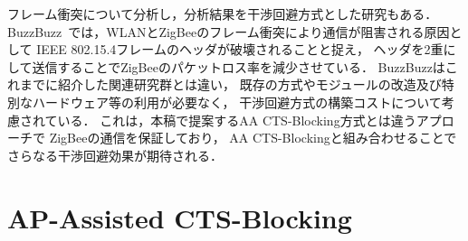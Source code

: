 \documentclass[technicalreport]{ieicej}
\begin{document}
フレーム衝突について分析し，分析結果を干渉回避方式とした研究もある．
BuzzBuzz~\cite{Chieh10:}では，WLANとZigBeeのフレーム衝突により通信が阻害される原因として
IEEE 802.15.4フレームのヘッダが破壊されることと捉え，
ヘッダを2重にして送信することでZigBeeのパケットロス率を減少させている．
BuzzBuzzはこれまでに紹介した関連研究群とは違い，
既存の方式やモジュールの改造及び特別なハードウェア等の利用が必要なく，
干渉回避方式の構築コストについて考慮されている．
これは，本稿で提案するAA CTS-Blocking方式とは違うアプローチで
ZigBeeの通信を保証しており，
AA CTS-Blockingと組み合わせることでさらなる干渉回避効果が期待される．







\section{AP-Assisted CTS-Blocking}
\label{sec:aa_cts}
\end{document}
